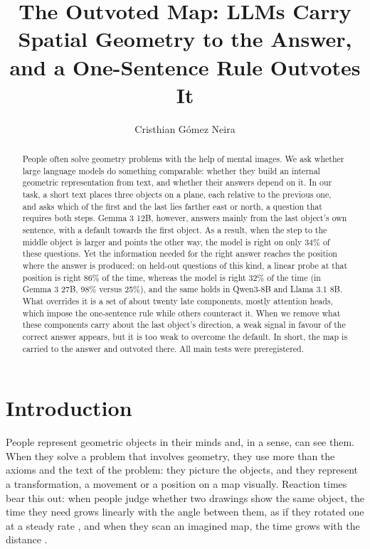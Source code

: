 \documentclass[11pt]{article}
\title{The Outvoted Map: LLMs Carry Spatial Geometry to the Answer,\\ and a One-Sentence Rule Outvotes It}
\author{Cristhian G\'omez Neira}
\date{}
\begin{document}
\maketitle

\begin{abstract}
People often solve geometry problems with the help of mental images. We ask whether large language models do
something comparable: whether they build an internal geometric representation from text, and whether their answers
depend on it. In our task, a short text places three objects on a plane, each relative to the previous one, and asks
which of the first and the last lies farther east or north, a question that requires both steps. Gemma 3 12B, however, answers mainly from the last object's own sentence, with a default towards the first object. As a result, when the step to the
middle object is larger and points the other way, the model is right on only 34\% of these questions. Yet the
information needed for the right answer reaches the position where the answer is produced: on held-out questions of
this kind, a linear probe at that position is right 86\% of the time, whereas the model is right 32\% of the time (in
Gemma 3 27B, 98\% versus 25\%), and the same holds in Qwen3-8B and Llama 3.1 8B. What overrides it is a set of about twenty late components, mostly attention heads, which impose the one-sentence rule while others counteract it. When we remove what these components carry about the last object's direction, a weak
signal in favour of the correct answer appears, but it is too weak to overcome the default. In short, the map is carried to the answer and outvoted there. All main tests were preregistered.
\end{abstract}

\section{Introduction}
People represent geometric objects in their minds and, in a sense, can see them. When they solve a problem that
involves geometry, they use more than the axioms and the text of the problem: they picture the objects, and they
represent a transformation, a movement or a position on a map visually. Reaction times bear this out: when people judge whether two drawings show the same object, the time they need grows linearly with the angle between them, as if
they rotated one at a steady rate \citep{shepard1971rotation}, and when they scan an imagined map, the time grows with
the distance \citep{kosslyn1978scanning}.
\end{document}
